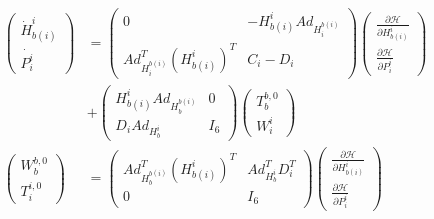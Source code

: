\documentclass[a4paper,twoside, openright,12pt]{report}
\begin{document}
\begin{eqnarray}\label{EQ:internalimpedance}
\begin{aligned}
\begin{pmatrix}\dot{H}_{b(i)}^i \\ 
\dot{P_i^i} \end{pmatrix} &= \begin{pmatrix}
0 & -H_{b(i)}^i Ad_{H_i^{b(i)}} \\
Ad_{H_i^{b(i)}}^T (H_{b(i)}^i)^T & C_i - D_i
\end{pmatrix}
\begin{pmatrix}
\frac{\partial \mathcal{H}}{\partial H_{b(i)}^i} \\ 
\frac{\partial \mathcal{H}}{\partial P_{i}^i}
\end{pmatrix}  \\
&+
\begin{pmatrix}
H_{b(i)}^i Ad_{H_b^{b(i)}} & 0 \\
D_i Ad_{H_b^i} & I_6
\end{pmatrix}
\begin{pmatrix}
T_b^{b,0} \\ W_i^i
\end{pmatrix}
 \\
\begin{pmatrix}
W_b^{b,0} \\ T_i^{i,0}
\end{pmatrix} &= 
\begin{pmatrix}
Ad_{H_b^{b(i)}}^T (H_{b(i)}^i)^T &  Ad_{H_b^i}^T D_i^T \\
 0 & I_6
\end{pmatrix}
\begin{pmatrix}
\frac{\partial \mathcal{H}}{\partial H_{b(i)}^i} \\ 
\frac{\partial \mathcal{H}}{\partial P_{i}^i}
\end{pmatrix}
\end{aligned}
\end{eqnarray}
\end{document}
